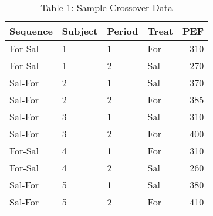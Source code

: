 \begin{table}
\centering
\caption{Table 1: Sample Crossover Data}
\centering
\begin{tabular}[t]{l|l|l|l|r}
\hline
Sequence & Subject & Period & Treat & PEF\\
\hline
For-Sal & 1 & 1 & For & 310\\
\hline
For-Sal & 1 & 2 & Sal & 270\\
\hline
Sal-For & 2 & 1 & Sal & 370\\
\hline
Sal-For & 2 & 2 & For & 385\\
\hline
Sal-For & 3 & 1 & Sal & 310\\
\hline
Sal-For & 3 & 2 & For & 400\\
\hline
For-Sal & 4 & 1 & For & 310\\
\hline
For-Sal & 4 & 2 & Sal & 260\\
\hline
Sal-For & 5 & 1 & Sal & 380\\
\hline
Sal-For & 5 & 2 & For & 410\\
\hline
\end{tabular}
\end{table}
